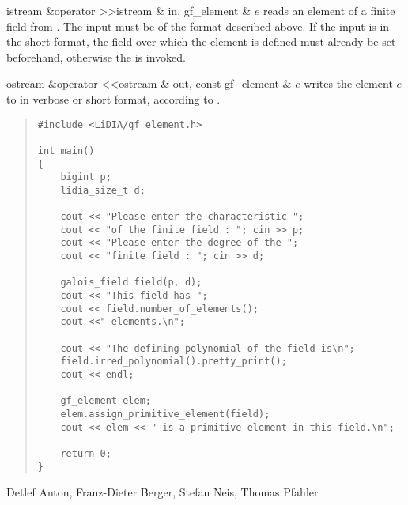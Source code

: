 \begin{fcode}{istream &}{operator >>}{istream & in, gf_element & $e$}
  reads an element of a finite field from  .  The input must be of the
  format described above.  If the input is in the short format, the field over which the element
  is defined must already be set beforehand, otherwise the \LEH is invoked.
\end{fcode}

\begin{fcode}{ostream &}{operator <<}{ostream & out, const gf_element & $e$}
  writes the element $e$ to   in verbose or short format, according
  to \linebreak{}.
\end{fcode}



\SEEALSO




\EXAMPLES

\begin{quote}
\begin{verbatim}
#include <LiDIA/gf_element.h>

int main()
{
    bigint p;
    lidia_size_t d;

    cout << "Please enter the characteristic ";
    cout << "of the finite field : "; cin >> p;
    cout << "Please enter the degree of the ";
    cout << "finite field : "; cin >> d;

    galois_field field(p, d);
    cout << "This field has ";
    cout << field.number_of_elements();
    cout <<" elements.\n";

    cout << "The defining polynomial of the field is\n";
    field.irred_polynomial().pretty_print();
    cout << endl;

    gf_element elem;
    elem.assign_primitive_element(field);
    cout << elem << " is a primitive element in this field.\n";

    return 0;
}
\end{verbatim}
\end{quote}



\AUTHOR

Detlef Anton, Franz-Dieter Berger, Stefan Neis, Thomas Pfahler
